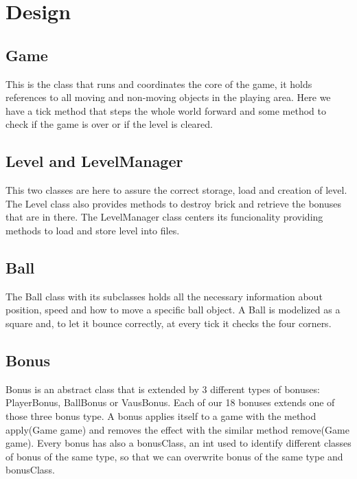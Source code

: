 \chapter*{Design}
\label{cha:design}

\section*{Game}
\label{sec:game}
This is the class that runs and coordinates the core of the game, it holds references to all moving and non-moving objects in the playing area. Here we have a tick method that steps the whole world forward and some method to check if the game is over or if the level is cleared.

\section*{Level and LevelManager}
\label{sec:level}
This two classes are here to assure the correct storage, load and creation of level. The Level class also provides methods to destroy brick and retrieve the bonuses that are in there. The LevelManager class centers its funcionality providing methods to load and store level into files.

\section*{Ball}
\label{sec:ball}
The Ball class with its subclasses holds all the necessary information about position, speed and how to move a specific ball object. A Ball is modelized as a square and, to let it bounce correctly, at every tick it checks the four corners.

\section*{Bonus}
\label{sec:bonus}
Bonus is an abstract class that is extended by 3 different types of bonuses: PlayerBonus, BallBonus or VausBonus. Each of our 18 bonuses extends one of those three bonus type. A bonus applies itself to a game with the method apply(Game game) and removes the effect with the similar method remove(Game game). Every bonus has also a bonusClass, an int used to identify different classes of bonus of the same type, so that we can overwrite bonus of the same type and bonusClass.

